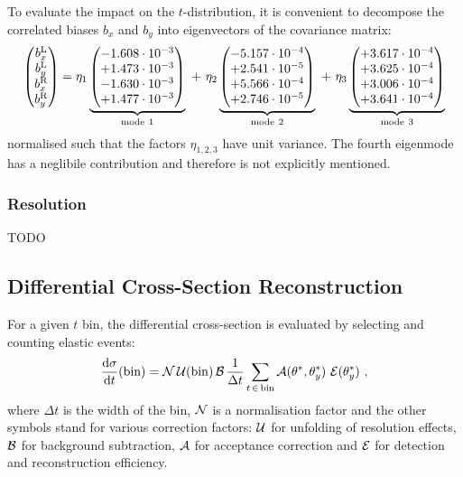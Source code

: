 To evaluate the impact on the $t$-distribution, it is convenient to decompose the correlated biases $b_x$ and $b_y$ into eigenvectors of the covariance matrix:
\begin{equation}
\label{eq:opt bias modes}
\begin{pmatrix} b_x^{\rm L}\cr b_y^{\rm L} \cr b_x^{\rm R}\cr b_y^{\rm R} \end{pmatrix} =
	   \eta_1 \underbrace{\begin{pmatrix} -1.608\cdot10^{-3}\cr +1.473\cdot10^{-3}\cr -1.630\cdot10^{-3}\cr +1.477\cdot10^{-3} \end{pmatrix}}_{\rm mode\ 1}
  \ +\ \eta_2 \underbrace{\begin{pmatrix} -5.157\cdot10^{-4}\cr +2.541\cdot10^{-5}\cr +5.566\cdot10^{-4}\cr +2.746\cdot10^{-5} \end{pmatrix}}_{\rm mode\ 2}
  \ +\ \eta_3 \underbrace{\begin{pmatrix} +3.617\cdot10^{-4}\cr +3.625\cdot10^{-4}\cr +3.006\cdot10^{-4}\cr +3.641\cdot10^{-4} \end{pmatrix}}_{\rm mode\ 3}
\end{equation}
normalised such that the factors $\eta_{1,2,3}$ have unit variance. The fourth eigenmode has a neglibile contribution and therefore is not explicitly mentioned.




\subsubsection{Resolution}
\label{sec:resolution}

TODO



\subsection{Differential Cross-Section Reconstruction}
\label{sec:diff cs}

For a given $t$ bin, the differential cross-section is evaluated by selecting and counting elastic events:
\begin{equation}
{\d\sigma\over \d t}(\hbox{bin}) =
	{\cal N}\, {\cal U}({\rm bin})\, {\cal B}\, {1\over \Delta t}
	\sum\limits_{t\, \in\, {\rm bin}} {\cal A}(\theta^*, \theta_y^*)\ {\cal E}(\theta_y^*)
	\ ,
\end{equation}
where $\Delta t$ is the width of the bin, ${\cal N}$ is a normalisation factor and the other symbols stand for various correction factors:
 ${\cal U}$ for unfolding of resolution effects, ${\cal B}$ for background subtraction, ${\cal A}$ for acceptance correction and ${\cal E}$ for detection and reconstruction efficiency.

